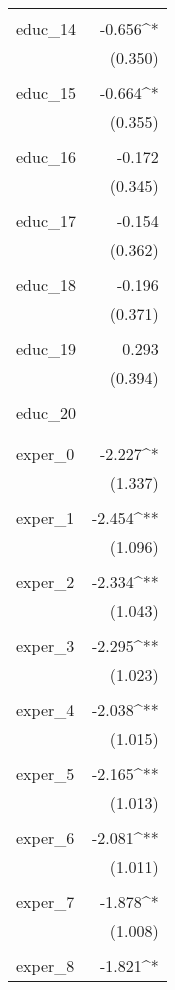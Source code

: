 \begin{table}[!htbp]
\begin{tabular}{@{\extracolsep{5pt}}lD{.}{.}{-3} }
  & \\ 
 educ\_14 & -0.656^{*} \\ 
  & (0.350) \\ 
  & \\ 
 educ\_15 & -0.664^{*} \\ 
  & (0.355) \\ 
  & \\ 
 educ\_16 & -0.172 \\ 
  & (0.345) \\ 
  & \\ 
 educ\_17 & -0.154 \\ 
  & (0.362) \\ 
  & \\ 
 educ\_18 & -0.196 \\ 
  & (0.371) \\ 
  & \\ 
 educ\_19 & 0.293 \\ 
  & (0.394) \\ 
  & \\ 
 educ\_20 &  \\ 
  &  \\ 
  & \\ 
 exper\_0 & -2.227^{*} \\ 
  & (1.337) \\ 
  & \\ 
 exper\_1 & -2.454^{**} \\ 
  & (1.096) \\ 
  & \\ 
 exper\_2 & -2.334^{**} \\ 
  & (1.043) \\ 
  & \\ 
 exper\_3 & -2.295^{**} \\ 
  & (1.023) \\ 
  & \\ 
 exper\_4 & -2.038^{**} \\ 
  & (1.015) \\ 
  & \\ 
 exper\_5 & -2.165^{**} \\ 
  & (1.013) \\ 
  & \\ 
 exper\_6 & -2.081^{**} \\ 
  & (1.011) \\ 
  & \\ 
 exper\_7 & -1.878^{*} \\ 
  & (1.008) \\ 
  & \\ 
 exper\_8 & -1.821^{*} \\ 

\end{tabular}
\end{table}
